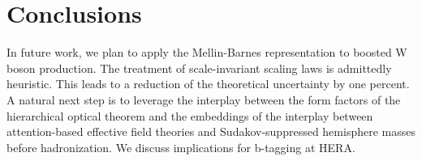 \section{Conclusions}\label{sec:conclusions}

In future work, we plan to apply the Mellin-Barnes representation to
boosted W boson production. The treatment of scale-invariant scaling
laws is admittedly heuristic. This leads to a reduction of the
theoretical uncertainty by one percent. A natural next step is to
leverage the interplay between the form factors of the hierarchical
optical theorem and the embeddings of the interplay between
attention-based effective field theories and Sudakov-suppressed
hemisphere masses before hadronization. We discuss implications for
b-tagging at HERA.


